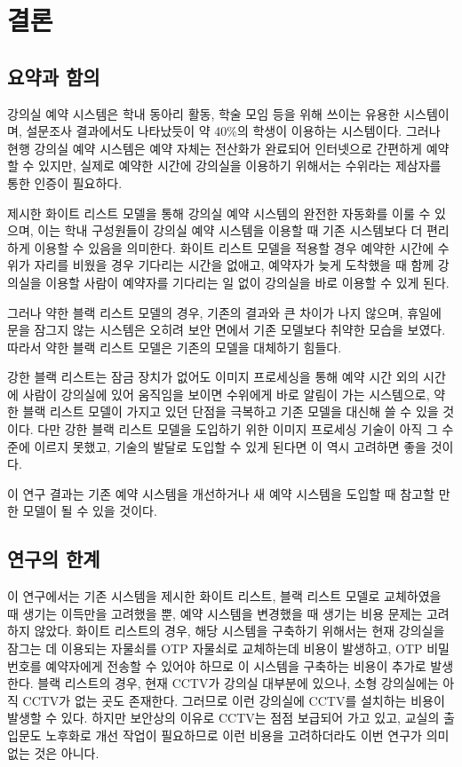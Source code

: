 \documentclass[11pt,a4paper]{article}
\begin{document}
\section{결론}

\subsection{요약과 함의}
강의실 예약 시스템은 학내 동아리 활동, 학술 모임 등을 위해 쓰이는 유용한
시스템이며, 설문조사 결과에서도 나타났듯이 약 40\%의 학생이 이용하는
시스템이다. 그러나 현행 강의실 예약 시스템은 예약 자체는 전산화가 완료되어
인터넷으로 간편하게 예약할 수 있지만, 실제로 예약한 시간에 강의실을 이용하기
위해서는 수위라는 제삼자를 통한 인증이 필요하다.

제시한 화이트 리스트 모델을 통해 강의실 예약 시스템의 완전한 자동화를 이룰 수
있으며, 이는 학내 구성원들이 강의실 예약 시스템을 이용할 때 기존 시스템보다 더
편리하게 이용할 수 있음을 의미한다. 화이트 리스트 모델을 적용할 경우 예약한
시간에 수위가 자리를 비웠을 경우 기다리는 시간을 없애고, 예약자가 늦게 도착했을
때 함께 강의실을 이용할 사람이 예약자를 기다리는 일 없이 강의실을 바로 이용할
수 있게 된다.

그러나 약한 블랙 리스트 모델의 경우, 기존의 결과와 큰 차이가 나지 않으며,
휴일에 문을 잠그지 않는 시스템은 오히려 보안 면에서 기존 모델보다 취약한 모습을
보였다. 따라서 약한 블랙 리스트 모델은 기존의 모델을 대체하기 힘들다.

강한 블랙 리스트는 잠금 장치가 없어도 이미지 프로세싱을 통해 예약 시간 외의
시간에 사람이 강의실에 있어 움직임을 보이면 수위에게 바로 알림이 가는
시스템으로, 약한 블랙 리스트 모델이 가지고 있던 단점을 극복하고 기존 모델을
대신해 쓸 수 있을 것이다. 다만 강한 블랙 리스트 모델을 도입하기 위한 이미지
프로세싱 기술이 아직 그 수준에 이르지 못했고, 기술의 발달로 도입할 수 있게
된다면 이 역시 고려하면 좋을 것이다.

이 연구 결과는 기존 예약 시스템을 개선하거나 새 예약 시스템을 도입할 때 참고할
만한 모델이 될 수 있을 것이다.

\subsection{연구의 한계}
이 연구에서는 기존 시스템을 제시한 화이트 리스트, 블랙 리스트 모델로 교체하였을
때 생기는 이득만을 고려했을 뿐, 예약 시스템을 변경했을 때 생기는 비용 문제는
고려하지 않았다.
화이트 리스트의 경우, 해당 시스템을 구축하기 위해서는 현재 강의실을 잠그는 데
이용되는 자물쇠를 OTP 자물쇠로 교체하는데 비용이 발생하고, OTP 비밀번호를
예약자에게 전송할 수 있어야 하므로 이 시스템을 구축하는 비용이 추가로 발생한다.
블랙 리스트의 경우, 현재 CCTV가 강의실 대부분에 있으나, 소형 강의실에는 아직
CCTV가 없는 곳도 존재한다. 그러므로 이런 강의실에 CCTV를 설치하는 비용이 발생할
수 있다.
하지만 보안상의 이유로 CCTV는 점점 보급되어 가고 있고, 교실의 출입문도 노후화로
개선 작업이 필요하므로 이런 비용을 고려하더라도 이번 연구가 의미 없는 것은
아니다.
\end{document}
